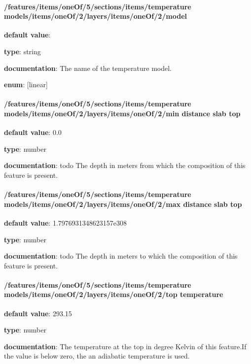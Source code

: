 \paragraph{/features/items/oneOf/5/sections/items/temperature models/items/oneOf/2/layers/items/oneOf/2/model} \begin{itemized}
\item {\bf default value}: 
\item {\bf type}: string
\item {\bf documentation}: The name of the temperature model.
\item {\bf enum}: [linear]\end{itemized}\paragraph{/features/items/oneOf/5/sections/items/temperature models/items/oneOf/2/layers/items/oneOf/2/min distance slab top} \begin{itemized}
\item {\bf default value}: 0.0
\item {\bf type}: number
\item {\bf documentation}: todo The depth in meters from which the composition of this feature is present.
\end{itemized}\paragraph{/features/items/oneOf/5/sections/items/temperature models/items/oneOf/2/layers/items/oneOf/2/max distance slab top} \begin{itemized}
\item {\bf default value}: 1.7976931348623157e308
\item {\bf type}: number
\item {\bf documentation}: todo The depth in meters to which the composition of this feature is present.
\end{itemized}\paragraph{/features/items/oneOf/5/sections/items/temperature models/items/oneOf/2/layers/items/oneOf/2/top temperature} \begin{itemized}
\item {\bf default value}: 293.15
\item {\bf type}: number
\item {\bf documentation}: The temperature at the top in degree Kelvin of this feature.If the value is below zero, the an adiabatic temperature is used.

\end{itemized}
